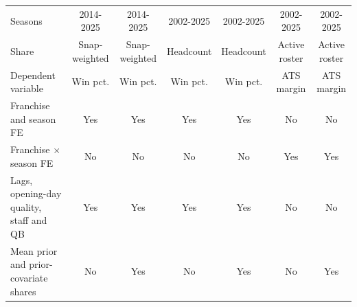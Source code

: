 \begin{table}[H]
{\begin{tabular}[t]{lcccccc}
Seasons & 2014-2025 & 2014-2025 & 2002-2025 & 2002-2025 & 2002-2025 & 2002-2025\\
Share & Snap-weighted & Snap-weighted & Headcount & Headcount & Active roster & Active roster\\
Dependent variable & Win pct. & Win pct. & Win pct. & Win pct. & ATS margin & ATS margin\\
Franchise and season FE & Yes & Yes & Yes & Yes & No & No\\
Franchise $\times$ season FE & No & No & No & No & Yes & Yes\\
Lags, opening-day quality, staff and QB & Yes & Yes & Yes & Yes & No & No\\
Mean prior and prior-covariate shares & No & Yes & No & Yes & No & Yes\\
\bottomrule
\end{tabular}}
\end{table}

